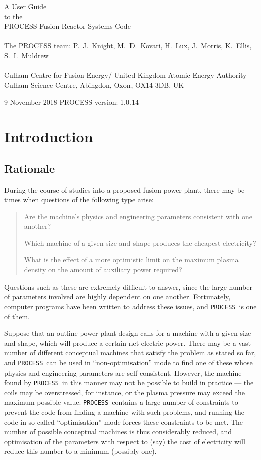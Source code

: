 \documentclass[11pt,a4paper]{report}
\newcommand{\process}{\mbox{\texttt{PROCESS}}}
\newcommand{\version}{
9 November 2018
\hfill
PROCESS version: 1.0.14
}
\newcommand{\setheader}[1]
 {\markright{\rlap{\lower0.8ex\hbox to\textwidth{\hrulefill}}{\bf#1}}}
\newcommand{\mychapter}[1]{\small\normalsize
 \setcounter{footnote}{0}
 \chapter{#1}
 \pagestyle{myheadings}
 \setheader{Chapter \thechapter\hspace{0.8em}#1}}
\begin{document}
\footnotesize
\hfill

\vspace*{4cm}
\begin{center}
\Huge A User Guide\\ to the \\ PROCESS Fusion Reactor Systems Code\\
~\\ \LARGE The PROCESS team: P.\ J.\ Knight, M.\ D.\ Kovari, H.\ Lux, J.\ Morris, K.\ Ellis, S.\ I.\ Muldrew\\
~\\ \Large Culham Centre for Fusion Energy/ United Kingdom Atomic Energy Authority\\
Culham Science Centre, Abingdon, Oxon, OX14 3DB, UK
\end{center}

\vfill
\footnotesize
\version
\normalsize

\tableofcontents

\listoffigures

\listoftables

\mychapter{Introduction}
\label{chap:intro}

\section{Rationale}

During the course of studies into a proposed fusion power plant, there may be
times when questions of the following type arise:
\begin{quote}
Are the machine's physics and engineering parameters consistent with one
another?

Which machine of a given size and shape produces the cheapest electricity?

What is the effect of a more optimistic limit on the maximum plasma density on
the amount of auxiliary power required?
\end{quote}

Questions such as these are extremely difficult to answer, since the large
number of parameters involved are highly dependent on one another.
Fortunately, computer programs have been written to address these issues, and
\process\ is one of them.

Suppose that an outline power plant design calls for a machine with a given
size and shape, which will produce a certain net electric power.  There may be
a vast number of different conceptual machines that satisfy the problem as
stated so far, and \process\ can be used in ``non-optimisation'' mode to find
one of these whose physics and engineering parameters are
self-consistent. However, the machine found by \process\ in this manner may
not be possible to build in practice --- the coils may be overstressed, for
instance, or the plasma pressure may exceed the maximum possible
value. \process\ contains a large number of constraints to prevent the code
from finding a machine with such problems, and running the code in so-called
``optimisation'' mode forces these constraints to be met. The number of
possible conceptual machines is thus considerably reduced, and optimisation of
the parameters with respect to (say) the cost of electricity will reduce this
number to a minimum (possibly one).
\end{document}
